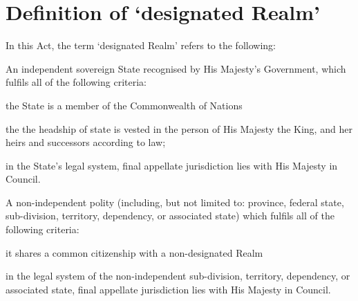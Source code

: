 \documentclass[private]{ukbill}
\begin{document}
\section{Definition of `designated Realm'}
\begin{numstat}
	\item In this Act, the term `designated Realm' refers to the following:
	\begin{alphstat}\item An independent sovereign State recognised by His Majesty's Government, which fulfils all of the following criteria:
\begin{romstat}
\item the State is a member of the Commonwealth of Nations
\item the the headship of state is vested in the person of His Majesty the King, and her heirs and successors according to law;
\item in the State's legal system, final appellate jurisdiction lies with His Majesty in Council.
  \end{romstat}
\item  A non-independent polity (including, but not limited to: province, federal state, sub-division, territory, dependency, or associated state) which fulfils all of the following criteria:
 \begin{romstat}
 	\item it shares a common citizenship with a non-designated Realm
 	\item in the legal system of the non-independent sub-division, territory, dependency, or associated state, final appellate jurisdiction lies with His Majesty in Council.
 	\end{romstat}
  		
  	\end{alphstat}
 
  \end{numstat}
\end{document}
